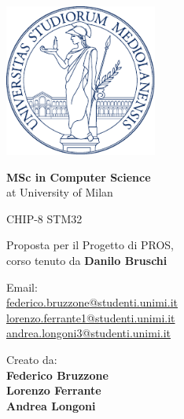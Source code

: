 \documentclass[a4paper]{article}
\begin{document}

\begin{titlepage}
    \begin{center}
        \includegraphics[height=5cm]{minerva.pdf}

        \vspace*{1.75cm}

        \LARGE

        \textbf{MSc in Computer Science} \\
        at University of Milan

        \vspace*{1cm}

        \huge
        CHIP-8 STM32

        \large Proposta per il Progetto di PROS, \\
        corso tenuto da \textbf{Danilo Bruschi}

        \normalsize
        \vspace*{4cm}

        \begin{minipage}[t]{0.47\textwidth}
            {Email: } \vspace{0.3em} \\
            {\large \href{federico.bruzzone@studenti.unimi.it}{federico.bruzzone@studenti.unimi.it}} \vspace{1em}  \\
            {\large \href{lorenzo.ferrante1@studenti.unimi.it}{lorenzo.ferrante1@studenti.unimi.it}} \vspace{1em}  \\
            {\large \href{andrea.longoni3@studenti.unimi.it}{andrea.longoni3@studenti.unimi.it}} \vspace{1em}  \\
        \end{minipage}
        \hfill
        \begin{minipage}[t]{0.47\textwidth}\raggedleft
            {Creato da:} \hspace{-0.9em} \vspace{0.3em} \\
            {\large \textbf{Federico Bruzzone}} \\
            \vspace{1em}
            {\large \textbf{Lorenzo Ferrante}} \\
            \vspace{1em}
            {\large \textbf{Andrea Longoni}}
        \end{minipage}


\end{center}
\end{titlepage}
\end{document}
